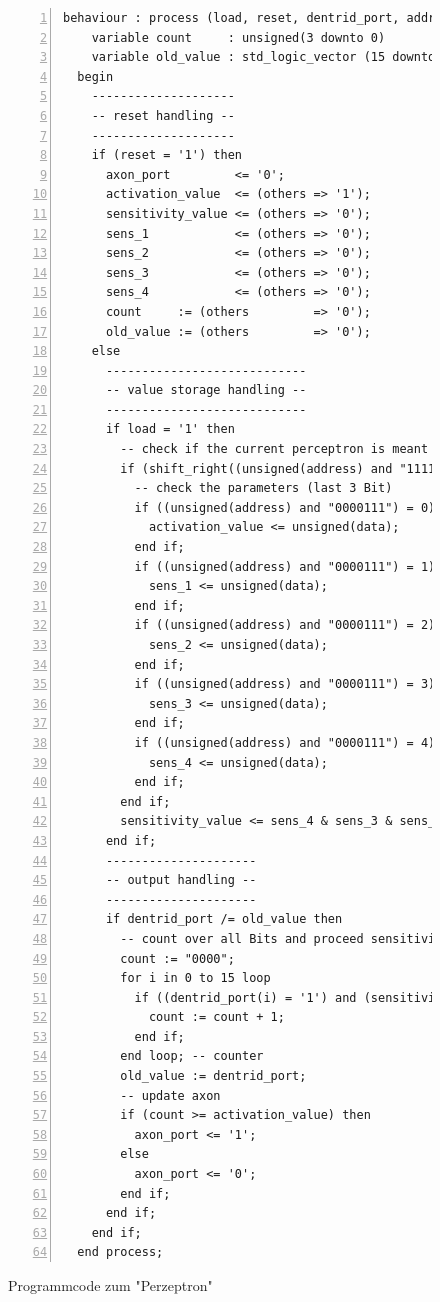 \documentclass{article}
\numberwithin{equation}{section}
\begin{document}
\begin{figure}[htbp]
\begin{lstlisting}[style=VHDL,numbers=left,stepnumber=1,style=myCustomMatlabStyle,basicstyle=\footnotesize]
behaviour : process (load, reset, dentrid_port, address, data) is
    variable count     : unsigned(3 downto 0)           := (others => '0');
    variable old_value : std_logic_vector (15 downto 0) := (others => '0');
  begin
    --------------------
    -- reset handling --
    --------------------
    if (reset = '1') then
      axon_port         <= '0';
      activation_value  <= (others => '1');
      sensitivity_value <= (others => '0');
      sens_1            <= (others => '0');
      sens_2            <= (others => '0');
      sens_3            <= (others => '0');
      sens_4            <= (others => '0');
      count     := (others         => '0');
      old_value := (others         => '0');
    else
      ----------------------------
      -- value storage handling --
      ----------------------------
      if load = '1' then
        -- check if the current perceptron is meant (first 4 Bit)
        if (shift_right((unsigned(address) and "1111000"), 3) = perceptron_id) then
          -- check the parameters (last 3 Bit)
          if ((unsigned(address) and "0000111") = 0) then
            activation_value <= unsigned(data);
          end if;
          if ((unsigned(address) and "0000111") = 1) then
            sens_1 <= unsigned(data);
          end if;
          if ((unsigned(address) and "0000111") = 2) then
            sens_2 <= unsigned(data);
          end if;
          if ((unsigned(address) and "0000111") = 3) then
            sens_3 <= unsigned(data);
          end if;
          if ((unsigned(address) and "0000111") = 4) then
            sens_4 <= unsigned(data);
          end if;
        end if;
        sensitivity_value <= sens_4 & sens_3 & sens_2 & sens_1;
      end if;
      ---------------------
      -- output handling --
      ---------------------
      if dentrid_port /= old_value then
        -- count over all Bits and proceed sensitivity and and output activation
        count := "0000";
        for i in 0 to 15 loop
          if ((dentrid_port(i) = '1') and (sensitivity_value(i) = '1')) then
            count := count + 1;
          end if;
        end loop; -- counter
        old_value := dentrid_port;
        -- update axon
        if (count >= activation_value) then
          axon_port <= '1';
        else
          axon_port <= '0';
        end if;
      end if;
    end if;
  end process;
\end{lstlisting}
\caption{Programmcode zum "Perzeptron"} \label{code:perceptron}
\end{figure}
\end{document}
